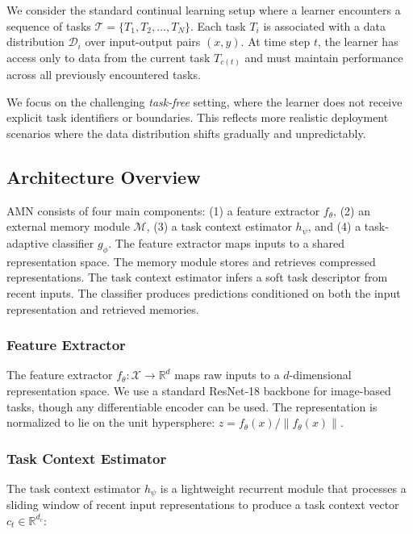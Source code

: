 \documentclass[11pt]{article}
\begin{document}
We consider the standard continual learning setup where a learner encounters a sequence of tasks $\mathcal{T} = \{T_1, T_2, \ldots, T_N\}$. Each task $T_i$ is associated with a data distribution $\mathcal{D}_i$ over input-output pairs $(x, y)$. At time step $t$, the learner has access only to data from the current task $T_{c(t)}$ and must maintain performance across all previously encountered tasks.

We focus on the challenging \emph{task-free} setting, where the learner does not receive explicit task identifiers or boundaries. This reflects more realistic deployment scenarios where the data distribution shifts gradually and unpredictably.

\subsection{Architecture Overview}

AMN consists of four main components: (1) a feature extractor $f_\theta$, (2) an external memory module $\mathcal{M}$, (3) a task context estimator $h_\psi$, and (4) a task-adaptive classifier $g_\phi$. The feature extractor maps inputs to a shared representation space. The memory module stores and retrieves compressed representations. The task context estimator infers a soft task descriptor from recent inputs. The classifier produces predictions conditioned on both the input representation and retrieved memories.

\subsubsection{Feature Extractor}

The feature extractor $f_\theta: \mathcal{X} \rightarrow \mathbb{R}^d$ maps raw inputs to a $d$-dimensional representation space. We use a standard ResNet-18 backbone \citep{he2016deep} for image-based tasks, though any differentiable encoder can be used. The representation is normalized to lie on the unit hypersphere: $z = f_\theta(x) / \|f_\theta(x)\|$.

\subsubsection{Task Context Estimator}

The task context estimator $h_\psi$ is a lightweight recurrent module that processes a sliding window of recent input representations to produce a task context vector $c_t \in \mathbb{R}^{d_c}$:
\end{document}
